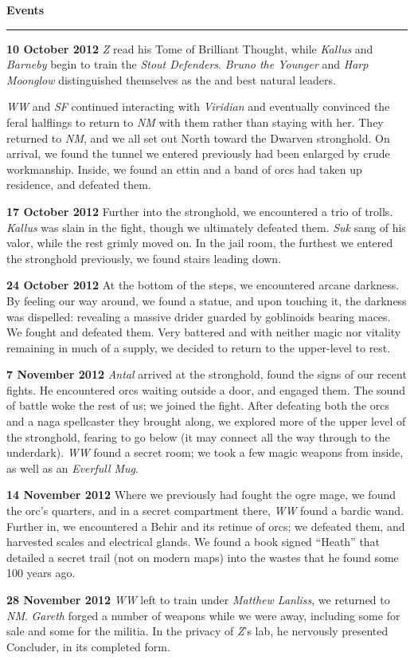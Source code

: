 \documentclass[letterpaper]{article}
\newcommand{\e}[1]{\emph{#1}}
\newcommand{\B}[1]{\textbf{#1}}
\newenvironment{notesection}[1]
{ {\huge \B{#1}}\hrule\vspace{0.5em}\begingroup\fontsize{9pt}{12pt}\selectfont}
{\endgroup}
\begin{document}
\begin{notesection}{Events}
\B{10 October 2012} \e{Z} read his Tome of Brilliant Thought, while \e{Kallus} and \e{Barneby} begin to train the \e{Stout Defenders}. \e{Bruno the Younger} and \e{Harp Moonglow} distinguished themselves as the and best natural leaders.

\e{WW} and \e{SF} continued interacting with \e{Viridian} and eventually convinced the feral halflings to return to \e{NM} with them rather than staying with her. They returned to \e{NM}, and we all set out North toward the Dwarven stronghold. On arrival, we found the tunnel we entered previously had been enlarged by crude workmanship. Inside, we found an ettin and a band of orcs had taken up residence, and defeated them. 

\B{17 October 2012} Further into the stronghold, we encountered a trio of trolls.  \e{Kallus} was slain in the fight, though we ultimately defeated them. \e{Suk} sang of his valor, while the rest grimly moved on. In the jail room, the furthest we entered the stronghold previously, we found stairs leading down. 

\B{24 October 2012} At the bottom of the steps, we encountered arcane darkness. By feeling our way around, we found a statue, and upon touching it, the darkness was dispelled: revealing a massive drider guarded by goblinoids bearing maces. We fought and defeated them. Very battered and with neither magic nor vitality remaining in much of a supply, we decided to return to the upper-level to rest.

\B{7 November 2012} \e{Antal} arrived at the stronghold, found the signs of our recent fights. He encountered orcs waiting outside a door, and engaged them. The sound of battle woke the rest of us; we joined the fight. After defeating both the orcs and a naga spellcaster they brought along, we explored more of the upper level of the stronghold, fearing to go below (it may connect all the way through to the underdark). \e{WW} found a secret room; we took a few magic weapons from inside, as well as an \e{Everfull Mug}. 

\B{14 November 2012} Where we previously had fought the ogre mage, we found the orc's quarters, and in a secret compartment there, \e{WW} found a bardic wand. Further in, we encountered a Behir and its retinue of orcs; we defeated them, and harvested scales and electrical glands.  We found a book signed ``Heath'' that detailed a secret trail (not on modern maps) into the wastes that he found some 100 years ago.

\B{28 November 2012} \e{WW} left to train under \e{Matthew Lanliss}, we returned to \e{NM}. \e{Gareth} forged a number of weapons while we were away, including some for sale and some for the militia. In the privacy of \e{Z}'s lab, he nervously presented Concluder, in its completed form.


\end{notesection}
\end{document}
